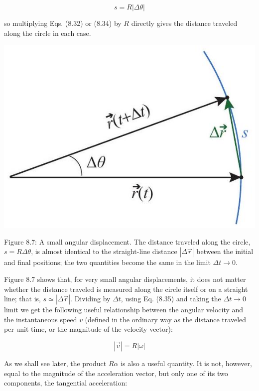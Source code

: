 \documentclass[10pt]{article}
\begin{document}
\begin{equation*}
s=R|\Delta \theta| \tag{8.35}
\end{equation*}


so multiplying Eqs. (8.32) or (8.34) by $R$ directly gives the distance traveled along the circle in each case.

\begin{center}
\includegraphics[max width=\textwidth]{2024_09_14_9969b06773f10b6936e8g-192}
\end{center}

Figure 8.7: A small angular displacement. The distance traveled along the circle, $s=R \Delta \theta$, is almost identical to the straight-line distance $|\Delta \vec{r}|$ between the initial and final positions; the two quantities become the same in the limit $\Delta t \rightarrow 0$.

Figure 8.7 shows that, for very small angular displacements, it does not matter whether the distance traveled is measured along the circle itself or on a straight line; that is, $s \simeq|\Delta \vec{r}|$. Dividing by $\Delta t$, using Eq. (8.35) and taking the $\Delta t \rightarrow 0$ limit we get the following useful relationship between the angular velocity and the instantaneous speed $v$ (defined in the ordinary way as the distance traveled per unit time, or the magnitude of the velocity vector):


\begin{equation*}
|\vec{v}|=R|\omega| \tag{8.36}
\end{equation*}


As we shall see later, the product $R \alpha$ is also a useful quantity. It is not, however, equal to the magnitude of the acceleration vector, but only one of its two components, the tangential acceleration:
\end{document}

